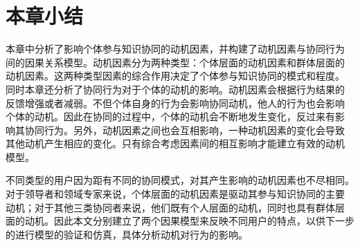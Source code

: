 \section{本章小结}

本章中分析了影响个体参与知识协同的动机因素，并构建了动机因素与协同行为
间的因果关系模型。动机因素分为两种类型：个体层面的动机因素和群体层面的
动机因素。这两种类型因素的综合作用决定了个体参与知识协同的模式和程度。
同时本章还分析了协同行为对于个体的动机的影响。动机因素会根据行为结果的
反馈增强或者减弱。不但个体自身的行为会影响协同动机，他人的行为也会影响
个体的动机。因此在协同的过程中，个体的动机会不断地发生变化，反过来有影
响其协同行为。另外，动机因素之间也会互相影响，一种动机因素的变化会导致
其他动机产生相应的变化。只有综合考虑因素间的相互影响才能建立有效的动机
模型。

不同类型的用户因为距有不同的协同模式，对其产生影响的动机因素也不尽相同。
对于领导者和领域专家来说，个体层面的动机因素是驱动其参与知识协同的主要
动机；对于其他三类协同者来说，他们既有个人层面的动机，同时也具有群体层
面的动机。因此本文分别建立了两个因果模型来反映不同用户的特点，以供下一步
的进行模型的验证和仿真，具体分析动机对行为的影响。
